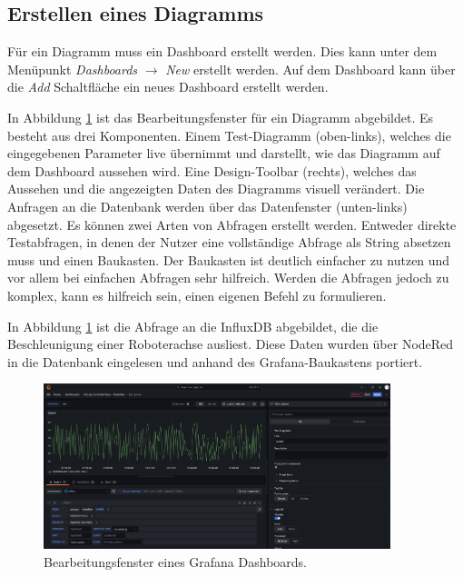 \documentclass[a4paper, 12pt, oneside, toc=listofnumbered, bibliography=totoc]{scrbook}
\begin{document}
		
		\subsection{Erstellen eines Diagramms}
		
		Für ein Diagramm muss ein Dashboard erstellt werden. Dies kann unter dem Menüpunkt \textit{Dashboards} $\rightarrow$ \textit{New} erstellt werden. Auf dem Dashboard kann über die \textit{Add} Schaltfläche ein neues Dashboard erstellt werden.
		
		In Abbildung \ref{fig:GrafanaDiagramm} ist das Bearbeitungsfenster für ein Diagramm abgebildet. Es besteht aus drei Komponenten. Einem Test-Diagramm (oben-links), welches die eingegebenen Parameter live übernimmt und darstellt, wie das Diagramm auf dem Dashboard aussehen wird. Eine Design-Toolbar (rechts), welches das Aussehen und die angezeigten Daten des Diagramms visuell verändert. Die Anfragen an die Datenbank werden über das Datenfenster (unten-links) abgesetzt. Es können zwei Arten von Abfragen erstellt werden. Entweder direkte Testabfragen, in denen der Nutzer eine vollständige Abfrage als String absetzen muss und einen Baukasten. Der Baukasten ist deutlich einfacher zu nutzen und vor allem bei einfachen Abfragen sehr hilfreich. Werden die Abfragen jedoch zu komplex, kann es hilfreich sein, einen eigenen Befehl zu formulieren.
		
		In Abbildung \ref{fig:GrafanaDiagramm} ist die Abfrage an die InfluxDB abgebildet, die die Beschleunigung einer Roboterachse ausliest. Diese Daten wurden über NodeRed in die Datenbank eingelesen und anhand des Grafana-Baukastens portiert. 
		
		\begin{figure}[H]
			\centering
			\includegraphics[width=0.9\textwidth]{res/Grafana-Diagramm.png}
			\caption{Bearbeitungsfenster eines Grafana Dashboards.}
			\label{fig:GrafanaDiagramm}
		\end{figure}
	
\end{document}
